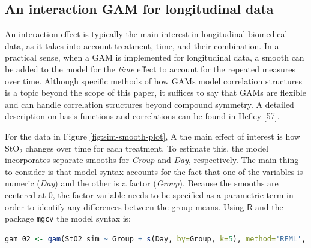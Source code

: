 \documentclass[
]{article}
\newcommand{\passthrough}[1]{#1}
\begin{document}
\hypertarget{an-interaction-gam-for-longitudinal-data}{%
\subsection{An interaction GAM for longitudinal data}\label{an-interaction-gam-for-longitudinal-data}}

An interaction effect is typically the main interest in longitudinal biomedical data, as it takes into account treatment, time, and their combination. In a practical sense, when a GAM is implemented for longitudinal data, a smooth can be added to the model for the \emph{time} effect to account for the repeated measures over time. Although specific methods of how GAMs model correlation structures is a topic beyond the scope of this paper, it suffices to say that GAMs are flexible and can handle correlation structures beyond compound symmetry. A detailed description on basis functions and correlations can be found in Hefley {[}\protect\hyperlink{ref-hefley2017}{57}{]}.

For the data in Figure \ref{fig:sim-smooth-plot}, A the main effect of interest is how \(\mbox{StO}_2\) changes over time for each treatment. To estimate this, the model incorporates separate smooths for \emph{Group} and \emph{Day}, respectively. The main thing to consider is that model syntax accounts for the fact that one of the variables is numeric (\emph{Day}) and the other is a factor (\emph{Group}). Because the smooths are centered at 0, the factor variable needs to be specified as a parametric term in order to identify any differences between the group means. Using \(\textsf{R}\) and the package \passthrough{\lstinline!mgcv!} the model syntax is:

\begin{lstlisting}[language=R]
gam_02 <- gam(StO2_sim ~ Group + s(Day, by=Group, k=5), method='REML', data = dat_sim)
\end{lstlisting}
\end{document}

